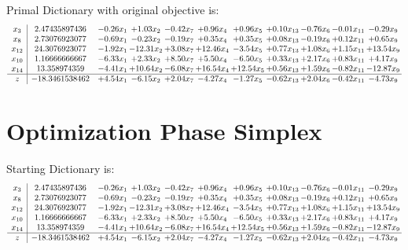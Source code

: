 \documentclass[9pt]{article}
\begin{document}
Primal Dictionary with original objective is:
\[\begin{array}{c| c c@{\hskip 2pt} c@{\hskip 2pt} c@{\hskip 2pt} c@{\hskip 2pt} c@{\hskip 2pt} c@{\hskip 2pt} c@{\hskip 2pt} c@{\hskip 2pt} c@{\hskip 2pt} }
 x_{3}   &  2.47435897436 & -0.26 x_{1} & +  1.03 x_{2} & -0.42 x_{7} & +  0.96 x_{4} & +  0.96 x_{5} & +  0.10 x_{13} & -0.76 x_{6} & -0.01 x_{11} & -0.29 x_{9}\\
 x_{8}   &  2.73076923077 & -0.69 x_{1} & -0.23 x_{2} & -0.19 x_{7} & +  0.35 x_{4} & +  0.35 x_{5} & +  0.08 x_{13} & -0.19 x_{6} & +  0.12 x_{11} & +  0.65 x_{9}\\
 x_{12}   &  24.3076923077 & -1.92 x_{1} & -12.31 x_{2} & +  3.08 x_{7} & + 12.46 x_{4} & -3.54 x_{5} & +  0.77 x_{13} & +  1.08 x_{6} & +  1.15 x_{11} & + 13.54 x_{9}\\
 x_{10}   &  1.16666666667 & -6.33 x_{1} & +  2.33 x_{2} & +  8.50 x_{7} & +  5.50 x_{4} & -6.50 x_{5} & +  0.33 x_{13} & +  2.17 x_{6} & +  0.83 x_{11} & +  4.17 x_{9}\\
 x_{14}   &  13.358974359 & -4.41 x_{1} & + 10.64 x_{2} & -6.08 x_{7} & + 16.54 x_{4} & + 12.54 x_{5} & +  0.56 x_{13} & +  1.59 x_{6} & -0.82 x_{11} & -12.87 x_{9}\\
\hline
z    &  -18.3461538462 & +  4.54 x_{1} & -6.15 x_{2} & +  2.04 x_{7} & -4.27 x_{4} & -1.27 x_{5} & -0.62 x_{13} & +  2.04 x_{6} & -0.42 x_{11} & -4.73 x_{9}\\
\end{array}\]
\section{Optimization Phase Simplex}
Starting Dictionary is:
\[\begin{array}{c| c c@{\hskip 2pt} c@{\hskip 2pt} c@{\hskip 2pt} c@{\hskip 2pt} c@{\hskip 2pt} c@{\hskip 2pt} c@{\hskip 2pt} c@{\hskip 2pt} c@{\hskip 2pt} }
 x_{3}   &  2.47435897436 & -0.26 x_{1} & +  1.03 x_{2} & -0.42 x_{7} & +  0.96 x_{4} & +  0.96 x_{5} & +  0.10 x_{13} & -0.76 x_{6} & -0.01 x_{11} & -0.29 x_{9}\\
 x_{8}   &  2.73076923077 & -0.69 x_{1} & -0.23 x_{2} & -0.19 x_{7} & +  0.35 x_{4} & +  0.35 x_{5} & +  0.08 x_{13} & -0.19 x_{6} & +  0.12 x_{11} & +  0.65 x_{9}\\
 x_{12}   &  24.3076923077 & -1.92 x_{1} & -12.31 x_{2} & +  3.08 x_{7} & + 12.46 x_{4} & -3.54 x_{5} & +  0.77 x_{13} & +  1.08 x_{6} & +  1.15 x_{11} & + 13.54 x_{9}\\
 x_{10}   &  1.16666666667 & -6.33 x_{1} & +  2.33 x_{2} & +  8.50 x_{7} & +  5.50 x_{4} & -6.50 x_{5} & +  0.33 x_{13} & +  2.17 x_{6} & +  0.83 x_{11} & +  4.17 x_{9}\\
 x_{14}   &  13.358974359 & -4.41 x_{1} & + 10.64 x_{2} & -6.08 x_{7} & + 16.54 x_{4} & + 12.54 x_{5} & +  0.56 x_{13} & +  1.59 x_{6} & -0.82 x_{11} & -12.87 x_{9}\\
\hline
z    &  -18.3461538462 & +  4.54 x_{1} & -6.15 x_{2} & +  2.04 x_{7} & -4.27 x_{4} & -1.27 x_{5} & -0.62 x_{13} & +  2.04 x_{6} & -0.42 x_{11} & -4.73 x_{9}\\
\end{array}\]
\end{document}
